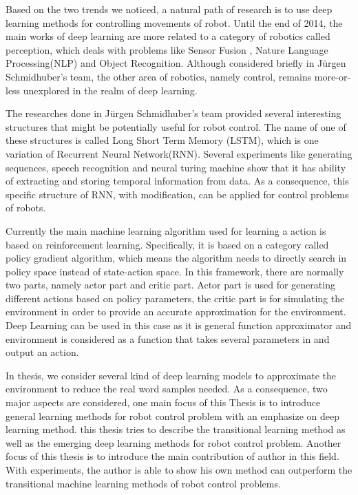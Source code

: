 \documentclass[officiallayout]{tktla}
\begin{document}
Based on the two trends we noticed, a natural path of research is to use deep learning methods for controlling movements of robot. Until the end of 2014,  the main works of deep learning are more related to a category of robotics called perception, which deals with problems like Sensor Fusion \cite{OConnor2013}, Nature Language Processing(NLP)\cite{Cho2014} and Object Recognition\cite{Lenz2013}\cite{Hoffman2014}. Although considered briefly in J{\"u}rgen Schmidhuber's team\cite{Mayer2006}, the other area of robotics, namely control, remains more-or-less unexplored in the realm of deep learning.

The researches done in J{\"u}rgen Schmidhuber's team provided several interesting structures that might be potentially useful for robot control. The name of one of these structures is called Long Short Term Memory (LSTM), which is one variation of Recurrent Neural Network(RNN). Several experiments like generating sequences\cite{Graves2013}, speech recognition\cite{Graves2013b} and neural turing machine \cite{Graves2014} show that it has ability of extracting and storing temporal information from data. As a consequence, this specific structure of RNN, with modification, can be applied for control problems of robots.

Currently the main machine learning algorithm used for learning a action is based on reinforcement learning. Specifically, it is based on a category called policy gradient algorithm, which means the algorithm needs to directly search in policy space instead of state-action space. In this framework, there are normally two parts, namely actor part and critic part. Actor part is used for generating different actions based on policy parameters, the critic part is for simulating the environment in order to provide an accurate approximation for the environment. Deep Learning can be used in this case as it is general function approximator and environment is considered as a function that takes several parameters in and output an action.

In thesis, we consider several kind of deep learning models to approximate the environment to reduce the real word samples needed. As a consequence, two major aspects are considered, one main focus of this Thesis is to introduce general learning methods for robot control problem with an emphasize on deep learning method. this thesis tries to describe the transitional learning method as well as the emerging deep learning methods for robot control problem. Another focus of this thesis is to introduce the main contribution of author in this field. With experiments, the author is able to show his own method can outperform the transitional machine learning methods of robot control problems.
\end{document}
